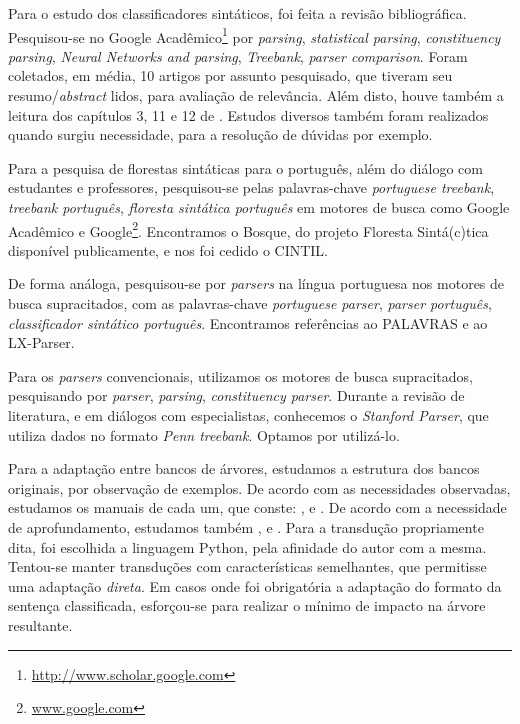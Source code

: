 

Para o estudo dos classificadores sintáticos, foi feita a revisão bibliográfica. Pesquisou-se no Google Acadêmico\footnote{\url{http://www.scholar.google.com}} por \textit{parsing}, \textit{statistical parsing}, \textit{constituency parsing}, \textit{Neural Networks and parsing}, \textit{Treebank}, \textit{parser comparison}. Foram coletados, em média, 10 artigos por assunto pesquisado, que tiveram seu resumo/\textit{abstract} lidos, para avaliação de relevância. Além disto, houve também a leitura dos capítulos 3, 11 e 12 de . Estudos diversos também foram realizados quando surgiu necessidade, para a resolução de dúvidas por exemplo.

Para a pesquisa de florestas sintáticas para o português, além do diálogo com estudantes e professores, pesquisou-se pelas palavras-chave \textit{portuguese treebank}, \textit{treebank português}, \textit{floresta sintática português} em motores de busca como Google Acadêmico e Google\footnote{\url{www.google.com}}. Encontramos o Bosque, do projeto Floresta Sintá(c)tica disponível publicamente, e nos foi cedido o CINTIL.

De forma análoga, pesquisou-se por \textit{parsers} na língua portuguesa nos motores de busca supracitados, com as palavras-chave \textit{portuguese parser}, \textit{parser português}, \textit{classificador sintático português}. Encontramos referências ao PALAVRAS e ao LX-Parser.

Para os \textit{parsers} convencionais, utilizamos os motores de busca supracitados, pesquisando por \textit{parser}, \textit{parsing}, \textit{constituency parser}. Durante a revisão de literatura, e em diálogos com especialistas, conhecemos o \textit{Stanford Parser}, que utiliza dados no formato \textit{Penn treebank}. Optamos por utilizá-lo.

Para a adaptação entre bancos de árvores, estudamos a estrutura dos bancos originais, por observação de exemplos. De acordo com as necessidades observadas, estudamos os manuais de cada um, que conste: ,   e . De acordo com a necessidade de aprofundamento, estudamos também ,  e . Para a transdução propriamente dita, foi escolhida a linguagem Python, pela afinidade do autor com a mesma. Tentou-se manter transduções com características semelhantes, que permitisse uma adaptação \textit{direta}. Em casos onde foi obrigatória a adaptação do formato da sentença classificada, esforçou-se para realizar o mínimo de impacto na árvore resultante. 

